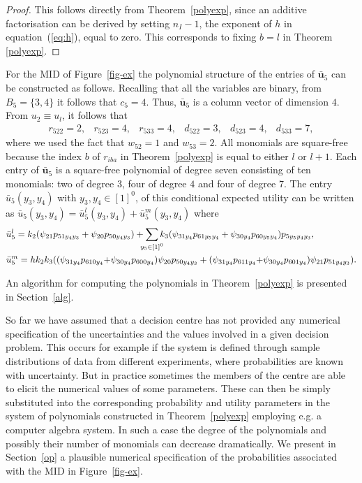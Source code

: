 \begin{proof}
This follows directly from Theorem~\ref{polyexp}, since an additive factorisation can be derived by setting $n_I-1$, the exponent of $h$ in equation~(\ref{eq:h}), equal to zero. This corresponds to fixing $b=l$ in Theorem \ref{polyexp}. %
  \end{proof}%

\begin{example}
For the MID of Figure~\ref{fig-ex} the polynomial structure of the entries of $\bar{\bm{u}}_5$ can be constructed as follows. Recalling that all the variables are binary,  from  $B_5=\{3,4\}$ it follows that $c_5=4$. Thus, $\bar{\bm{u}}_5$ is a column vector of dimension $4$. From $u_2\equiv u_l$, it follows that
\begin{equation*}
\begin{array}{cccccc}
r_{522}=2, & r_{523}=4, &r_{533}=4,&
d_{522}=3, &d_{523}=4, &d_{533}=7,
\end{array}
\end{equation*}
where we used the fact that $w_{52}=1$ and $w_{53}=2$. All monomials are square-free because the index $b$ of $r_{iba}$ in Theorem~\ref{polyexp} is  equal to either $l$ or $l+1$. Each entry of $\bar{\bm{u}}_5$ is a square-free polynomial of degree seven consisting of ten monomials: two  of degree $3$, four of degree $4$ and four of degree $7$. 
The entry $\bar{u}_5(y_3,y_4)$ with $y_3,y_4\in[1]^0$, of this conditional expected utility  can be written as $\bar{u}_5(y_3,y_4)=\bar{u}_5^l(y_3,y_4)+\bar{u}_5^{m}(y_3,y_4)$ where
\begin{align}
&\bar{u}_5^l=k_2(\psi_{21}p_{51y_4y_3}+\psi_{20}p_{50y_4y_3})+\sum_{\mathclap{y_5\in[1]^0}}k_3(\psi_{31y_4}p_{61y_5y_4}+\psi_{30y_4}p_{60y_5y_4})p_{5y_5y_4y_3},\label{u51}\\
&\label{u52}\bar{u}_5^{m}=hk_2k_3((\psi_{31y_4}p_{610y_4}{+\psi_{30y_4}p_{600y_4}})\psi_{20}p_{50y_4y_3}+(\psi_{31y_4}p_{611y_4}{+\psi_{30y_4}p_{601y_4})\psi_{21}p_{51y_4y_3}}).
\end{align}
 \end{example}
 
An algorithm for computing the polynomials in Theorem~\ref{polyexp} is presented in Section~\ref{alg}.

So far we have assumed that a decision centre has not provided any numerical specification of the uncertainties and the values  involved in a given decision problem.  This occurs for example if the system is defined through sample distributions of data from different experiments, where  probabilities are known with uncertainty.  But in practice sometimes   the members of the centre are able to elicit the numerical values of some parameters. These can then be simply substituted into the corresponding probability and utility parameters in the system of polynomials constructed in Theorem~\ref{polyexp} employing e.g. a computer algebra system. In such a case the degree of the polynomials and possibly their number of monomials can decrease dramatically. We present in Section~\ref{op} a plausible numerical specification of  the probabilities associated with the MID in Figure~\ref{fig-ex}.


